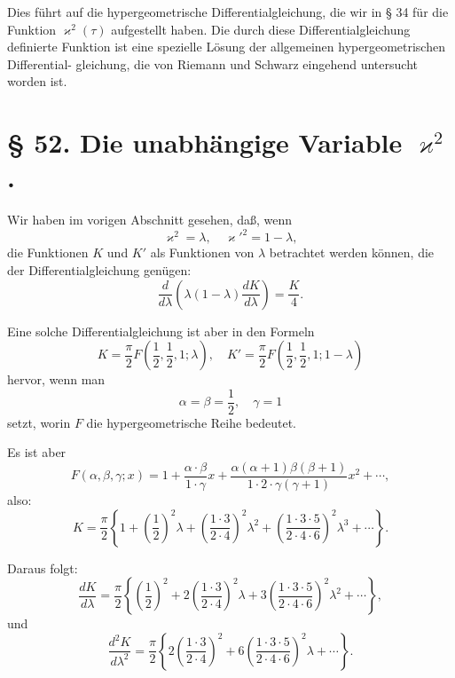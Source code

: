 \documentclass[12pt,a4paper]{article}
\theoremstyle{definition}
\begin{document}
Dies f\"{u}hrt auf die hypergeometrische Differentialgleichung,
die wir in \S{} 34 f\"{u}r die Funktion $\varkappa^2(\tau)$ aufgestellt haben. Die
durch diese Differentialgleichung definierte Funktion ist eine
spezielle L\"{o}sung der allgemeinen hypergeometrischen Differential-
gleichung, die von Riemann und Schwarz eingehend untersucht
worden ist.

\section*{\S{} 52. Die unabh\"{a}ngige Variable $\varkappa^2$.}

Wir haben im vorigen Abschnitt gesehen, da\ss, wenn
\begin{equation}\tag{1}
\varkappa^2 = \lambda, \quad \varkappa'^2 = 1 - \lambda,
\end{equation}
die Funktionen $K$ und $K'$ als Funktionen von $\lambda$ betrachtet
werden k\"{o}nnen, die der Differentialgleichung gen\"{u}gen:
\begin{equation}\tag{2}
\frac{d}{d\lambda}\left(\lambda(1-\lambda)\frac{dK}{d\lambda}\right) = \frac{K}{4}.
\end{equation}

Eine solche Differentialgleichung ist aber in den Formeln
\begin{equation}\tag{3}
K = \frac{\pi}{2}F\left(\frac{1}{2}, \frac{1}{2}, 1; \lambda\right), \quad
K' = \frac{\pi}{2}F\left(\frac{1}{2}, \frac{1}{2}, 1; 1-\lambda\right)
\end{equation}
hervor, wenn man
\begin{equation}\tag{4}
\alpha = \beta = \frac{1}{2}, \quad \gamma = 1
\end{equation}
setzt, worin $F$ die hypergeometrische Reihe bedeutet.

Es ist aber
\begin{equation}\tag{5}
F(\alpha, \beta, \gamma; x) = 1 + \frac{\alpha\cdot\beta}{1\cdot\gamma}x + \frac{\alpha(\alpha+1)\beta(\beta+1)}{1\cdot2\cdot\gamma(\gamma+1)}x^2 + \cdots,
\end{equation}
also:
\begin{equation}\tag{6}
K = \frac{\pi}{2}\left\{1 + \left(\frac{1}{2}\right)^2\lambda + \left(\frac{1\cdot3}{2\cdot4}\right)^2\lambda^2 + \left(\frac{1\cdot3\cdot5}{2\cdot4\cdot6}\right)^2\lambda^3 + \cdots\right\}.
\end{equation}

Daraus folgt:
\begin{equation}\tag{7}
\frac{dK}{d\lambda} = \frac{\pi}{2}\left\{\left(\frac{1}{2}\right)^2 + 2\left(\frac{1\cdot3}{2\cdot4}\right)^2\lambda + 3\left(\frac{1\cdot3\cdot5}{2\cdot4\cdot6}\right)^2\lambda^2 + \cdots\right\},
\end{equation}
und
\begin{equation}\tag{8}
\frac{d^2K}{d\lambda^2} = \frac{\pi}{2}\left\{2\left(\frac{1\cdot3}{2\cdot4}\right)^2 + 6\left(\frac{1\cdot3\cdot5}{2\cdot4\cdot6}\right)^2\lambda + \cdots\right\}.
\end{equation}
\end{document}
